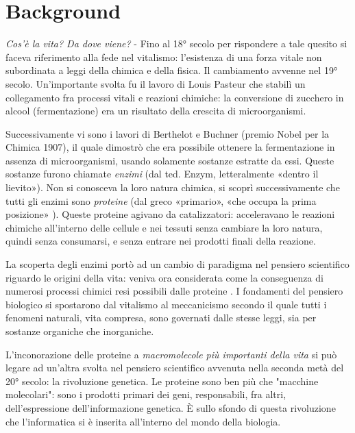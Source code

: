 \chapter{Background}

\textit{Cos'è la vita? Da dove viene?} - Fino al 18° secolo per rispondere a tale quesito si faceva riferimento alla fede nel vitalismo: l'esistenza di una forza vitale non subordinata a leggi della chimica e  della fisica.
Il cambiamento avvenne nel 19° secolo.
Un'importante svolta fu il lavoro di Louis Pasteur che stabilì un collegamento fra processi vitali e reazioni chimiche: la conversione di zucchero in alcool (fermentazione) era un risultato della crescita di microorganismi.
\par Successivamente vi sono i lavori di Berthelot e Buchner (premio Nobel per la Chimica 1907), il quale dimostrò che era possibile ottenere la fermentazione in assenza di microorganismi, usando solamente sostanze estratte da essi.
Queste sostanze furono chiamate \textit{enzimi} (dal ted. Enzym, letteralmente «dentro il lievito»\supercite{enzimaTreccani}). Non si conosceva la loro natura chimica, si scoprì successivamente che tutti gli enzimi sono \textit{proteine} (dal greco «primario», «che occupa la prima posizione» \supercite{proteinaTreccani}).
Queste proteine agivano da catalizzatori: acceleravano le reazioni chimiche all'interno delle cellule e nei tessuti senza cambiare la loro natura, quindi senza consumarsi, e senza entrare nei prodotti finali della reazione.

\par La scoperta degli enzimi portò ad un cambio di paradigma nel pensiero scientifico riguardo le origini della vita: veniva ora considerata come la conseguenza di numerosi processi chimici resi possibili dalle proteine \supercite{kessel_ben-tal_2018}.
I fondamenti del pensiero biologico si spostarono dal vitalismo al meccanicismo secondo il quale tutti i fenomeni naturali, vita compresa, sono governati dalle stesse leggi, sia per sostanze organiche che inorganiche.

\par L'inconorazione delle proteine a \textit{macromolecole più importanti della vita} si può legare ad un'altra svolta nel pensiero scientifico avvenuta nella seconda metà del 20° secolo: la rivoluzione genetica. 
Le proteine sono ben più che "macchine molecolari": sono i prodotti primari dei geni, responsabili, fra altri, dell'espressione dell'informazione genetica. È sullo sfondo di questa rivoluzione che l'informatica si è inserita all'interno del mondo della biologia.


